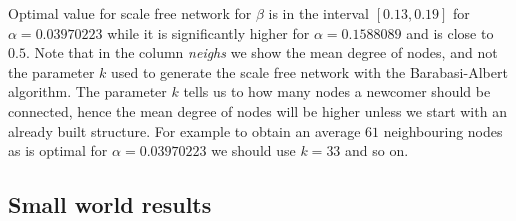 Optimal value for scale free network for $\beta$ is in the interval $[0.13,0.19]$ for $\alpha=0.03970223$ while it is significantly higher for $\alpha=0.1588089$ and is close to $0.5$.
Note that in the column \textit{neighs} we show the mean degree of nodes, and not the parameter $k$ used to generate the scale free network with the Barabasi-Albert algorithm.
The parameter $k$ tells us to how many nodes a newcomer should be connected, hence the mean degree of nodes will be higher unless we start with an already built structure.
For example to obtain an average $61$ neighbouring nodes as is optimal for $\alpha=0.03970223$ we should use $k=33$ and so on.

\begin{table}
\tiny
\centering
{}
\caption{Scale free neighbourhood table}
\label{table:Scale free vicinity table}
\end{table}

\subsection{Small world results}

